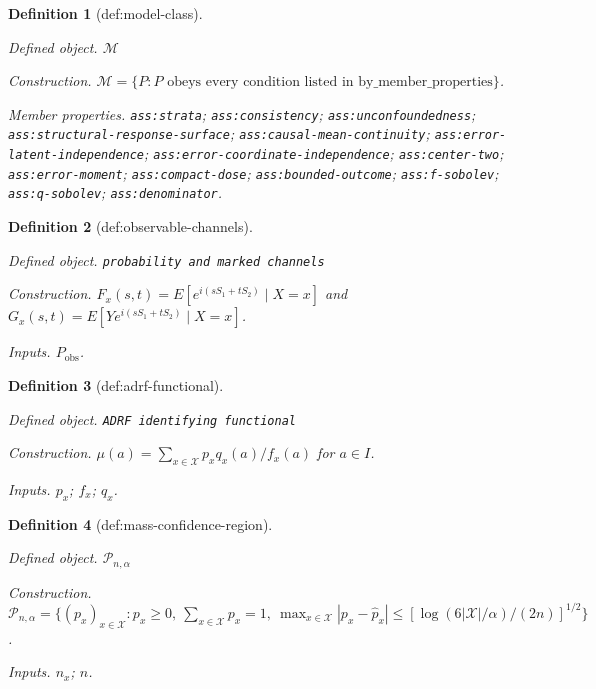 \documentclass{article}
\newtheorem{definition}{Definition}
\begin{document}
\begin{definition}[def:model-class]\label{def:model-class}
\par\smallskip\noindent\emph{Defined object.} \(\mathcal M\)
\par\smallskip\noindent\emph{Construction.} \(\mathcal M=\{P:P\text{ obeys every condition listed in }\mathrm{by\_member\_properties}\}\).
\par\smallskip\noindent\emph{Member properties.} \texttt{ass:\allowbreak{}strata}; \texttt{ass:\allowbreak{}consistency}; \texttt{ass:\allowbreak{}unconfoundedness}; \texttt{ass:\allowbreak{}structural-\allowbreak{}response-\allowbreak{}surface}; \texttt{ass:\allowbreak{}causal-\allowbreak{}mean-\allowbreak{}continuity}; \texttt{ass:\allowbreak{}error-\allowbreak{}latent-\allowbreak{}independence}; \texttt{ass:\allowbreak{}error-\allowbreak{}coordinate-\allowbreak{}independence}; \texttt{ass:\allowbreak{}center-\allowbreak{}two}; \texttt{ass:\allowbreak{}error-\allowbreak{}moment}; \texttt{ass:\allowbreak{}compact-\allowbreak{}dose}; \texttt{ass:\allowbreak{}bounded-\allowbreak{}outcome}; \texttt{ass:\allowbreak{}f-\allowbreak{}sobolev}; \texttt{ass:\allowbreak{}q-\allowbreak{}sobolev}; \texttt{ass:\allowbreak{}denominator}.
\end{definition}

\begin{definition}[def:observable-channels]\label{def:observable-channels}
\par\smallskip\noindent\emph{Defined object.} \texttt{probability and marked channels}
\par\smallskip\noindent\emph{Construction.} \(F_x(s,t)=E[e^{i(sS_1+tS_2)}\mid X=x]\) and \(G_x(s,t)=E[Ye^{i(sS_1+tS_2)}\mid X=x]\).
\par\smallskip\noindent\emph{Inputs.} \(P_{\mathrm{obs}}\).
\end{definition}

\begin{definition}[def:adrf-functional]\label{def:adrf-functional}
\par\smallskip\noindent\emph{Defined object.} \texttt{ADRF identifying functional}
\par\smallskip\noindent\emph{Construction.} \(\mu(a)=\sum_{x\in\mathcal X}p_xq_x(a)/f_x(a)\) for \(a\in I\).
\par\smallskip\noindent\emph{Inputs.} \(p_x\); \(f_x\); \(q_x\).
\end{definition}

\begin{definition}[def:mass-confidence-region]\label{def:mass-confidence-region}
\par\smallskip\noindent\emph{Defined object.} \(\mathcal P_{n,\alpha}\)
\par\smallskip\noindent\emph{Construction.} \(\mathcal P_{n,\alpha}=\{(p_x)_{x\in\mathcal X}:p_x\ge0,\ \sum_{x\in\mathcal X}p_x=1,\ \max_{x\in\mathcal X}|p_x-\widehat p_x|\le[\log(6|\mathcal X|/\alpha)/(2n)]^{1/2}\}\).
\par\smallskip\noindent\emph{Inputs.} \(n_x\); \(n\).
\end{definition}
\end{document}
